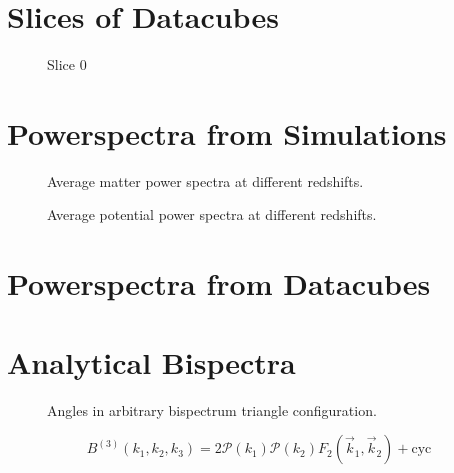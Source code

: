 %
%

\section{Slices of Datacubes}

  \begin{figure}
    \centering
    \caption{Slice 0}
  \end{figure}

\section{Powerspectra from Simulations}

  \begin{figure}
      \centering
      \caption{Average matter power spectra at different redshifts.}
    \end{figure}

    \begin{figure}
      \centering
      \caption{Average potential power spectra at different redshifts.}
    \end{figure}

\section{Powerspectra from Datacubes}

\section{Analytical Bispectra}

  \begin{figure}
    \centering
    \label{fig:data:verification:bispectrum_angles}
    
    \caption{Angles in arbitrary bispectrum triangle configuration.}
  \end{figure}
  \begin{equation}
    B^{(3)}(k_1,k_2,k_3) = 2\mathcal{P}(k_1)\mathcal{P}(k_2)F_2(\vec{k}_1, \vec{k}_2) + \mathrm{cyc}
  \end{equation}

